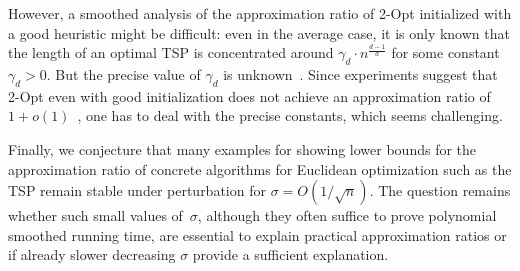 \documentclass[11pt,DIV=12,a4paper]{scrartcl}
\begin{document}
However, a smoothed analysis of the approximation ratio of 2-Opt initialized with a good heuristic might be difficult: even in the average case,
it is only known that the length of an optimal TSP is concentrated around $\gamma_d \cdot n^{\frac{d-1}d}$ for some constant $\gamma_d > 0$.
But the precise value of $\gamma_d$ is unknown~\cite{Yukich:ProbEuclidean:1998}. Since experiments suggest that 2-Opt even with good initialization does not
achieve an approximation ratio of $1+o(1)$~\cite{JohnsonMcGeoch:CaseTSP:1997,JohnsonMcGeoch:ExperimentalSTSP:2002}, one has to deal with the precise
constants, which seems challenging.

Finally, we conjecture that many examples for showing lower bounds for the approximation ratio of concrete algorithms
for Euclidean optimization such as the TSP remain stable under perturbation for $\sigma = O(1/\sqrt n)$.
The question remains whether such small values of~$\sigma$, although they often suffice to prove polynomial smoothed running time,
are essential to explain practical approximation ratios or if already slower decreasing $\sigma$ provide a sufficient explanation.
\end{document}
